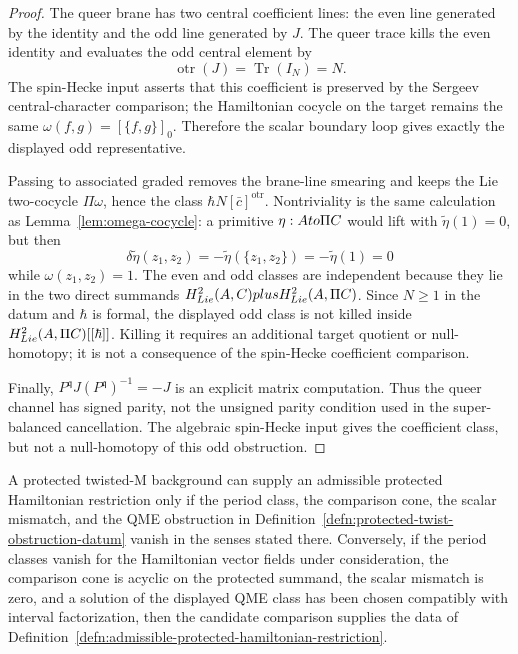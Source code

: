\begin{proof}
  The queer brane has two central coefficient lines:
  the even line generated by the identity and the odd line generated by
  \(J\).  The queer trace kills the even identity and evaluates the odd
  central element by
  \[
    \operatorname{otr}(J)=
    \operatorname{Tr}(I_N)=N .
  \]
  The spin-Hecke input asserts that this coefficient is preserved by the
  Sergeev central-character comparison; the Hamiltonian cocycle on the
  target remains the same \(\omega(f,g)=[\{f,g\}]_0\).  Therefore the
  scalar boundary loop gives exactly the displayed odd representative.

  Passing to associated graded removes the brane-line smearing and keeps
  the Lie two-cocycle \(\Pi\omega\), hence the class
  \(\hbar N[\bar c]^{\mathrm{otr}}\).  Nontriviality is the same
  calculation as Lemma~\ref{lem:omega-cocycle}: a primitive
  \(\eta:Ato\Pi C\) would lift with
  \(\tilde\eta(1)=0\), but then
  \[
    \delta\tilde\eta(z_1,z_2)
      =-\tilde\eta(\{z_1,z_2\})
      =-\tilde\eta(1)=0
  \]
  while \(\omega(z_1,z_2)=1\).
  The even and odd classes are independent because they lie in the two
  direct summands
  \(H^2_{Lie}(A,C)plus
  H^2_{Lie}(A,\Pi C)\).
  Since \(N\ge1\) in the datum and \(\hbar\) is formal, the displayed
  odd class is not killed inside
  \(H^2_{Lie}(A,\Pi C)[[\hbar]]\).  Killing it requires an
  additional target quotient or null-homotopy; it is not a consequence
  of the spin-Hecke coefficient comparison.

  Finally,
  \(P^{\mathfrak q}J(P^{\mathfrak q})^{-1}=-J\) is an explicit matrix
  computation.  Thus the queer channel has signed parity, not the
  unsigned parity condition used in the super-balanced cancellation.
  The algebraic spin-Hecke input gives the coefficient class, but not a
  null-homotopy of this odd obstruction.
\end{proof}

\begin{lem}\label{lem:protected-primary-obstruction-test}
  A protected twisted-M background can supply an admissible protected
  Hamiltonian restriction only if the period class, the comparison cone,
  the scalar mismatch, and the QME obstruction in
  Definition~\ref{defn:protected-twist-obstruction-datum} vanish in the
  senses stated there.  Conversely, if the period classes vanish for the
  Hamiltonian vector fields under consideration, the comparison cone is
  acyclic on the protected summand, the scalar mismatch is zero, and a
  solution of the displayed QME class has been chosen compatibly with
  interval factorization, then the candidate comparison supplies the data
  of Definition~\ref{defn:admissible-protected-hamiltonian-restriction}.
\end{lem}

